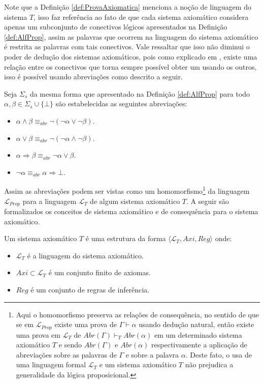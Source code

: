 Note que a Definição \ref{def:ProvaAxiomatica} menciona a noção de linguagem do sistema $T$, isso faz referência ao fato de que cada sistema axiomático considera apenas um subconjunto de conectivos lógicos apresentados na Definição \ref{def:AlfProp}, assim as palavras que ocorrem na linguagem do sistema axiomático é restrita as palavras com tais conectivos. Vale ressaltar que isso não diminui o poder de dedução dos sistemas axiomáticos, pois como explicado em \cite{BenjaV1}, existe uma relação entre os conectivos que torna sempre possível obter um usando os outros, isso é possível usando abreviações como descrito a seguir. 

\begin{definition}\label{def:Abreviacoes}
    Seja $\Sigma_s$ da mesma forma que apresentado na Definição \ref{def:AlfProp} para todo $\alpha, \beta \in \Sigma_s \cup \{\bot\}$ são estabelecidas as seguintes abreviações:
    \begin{itemize}
        \item $\alpha \land \beta \equiv_{abr} \neg (\neg \alpha \lor \neg \beta)$.
        \item $\alpha \lor \beta \equiv_{abr} \neg (\neg \alpha \land \neg \beta)$.
        \item $\alpha \Rightarrow \beta \equiv_{abr} \neg \alpha \lor \beta$.
        \item $\neg \alpha \equiv_{abr} \alpha \Rightarrow \bot$.
    \end{itemize}
\end{definition}

Assim as abreviações podem ser vistas como um homomorfismo\footnote{Aqui o homomorfismo preserva as relações de consequência, no sentido de que se em $\mathcal{L}_{Prop}$ existe uma prova de $\Gamma \vdash \alpha$ usando dedução natural, então existe uma prova em $\mathcal{L}_T$ de $Abr(\Gamma) \vdash_T Abr(\alpha)$ em um determinado sistema axiomático $T$ e sendo $Abr(\Gamma)$ e $Abr(\alpha)$ respectivamente a aplicação de abreviações sobre as palavras de $\Gamma$ e sobre a palavra $\alpha$. Deste fato, o usa de uma linguagem formal $\mathcal{L}_T$ e um sistema axiomático $T$ não prejudica a generalidade da lógica proposicional.} da linguagem $\mathcal{L}_{Prop}$ para a linguagem $\mathcal{L}_T$ de algum sistema axiomático $T$. A seguir são formalizados os conceitos de sistema axiomático e de consequência para o sistema axiomático.

\begin{definition}\label{def:SistemaAxiomatico}
    Um sistema axiomático $T$ é uma estrutura da forma $\langle \mathcal{L}_T, Axi, Reg \rangle$ onde:
    \begin{itemize}
        \item $\mathcal{L}_T$ é a linguagem do sistema axiomático.
        \item $Axi \subset \mathcal{L}_T$ é um conjunto finito de axiomas.
        \item $Reg$ é um conjunto de regras de inferência.
    \end{itemize}
\end{definition}

